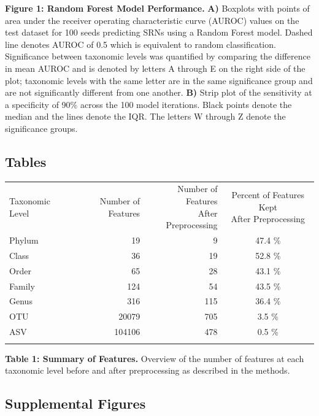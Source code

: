 \documentclass[
]{article}
\begin{document}
\textbf{Figure 1: Random Forest Model Performance.} \textbf{A)} Boxplots
with points of area under the receiver operating characteristic curve
(AUROC) values on the test dataset for 100 seeds predicting SRNs using a
Random Forest model. Dashed line denotes AUROC of 0.5 which is
equivalent to random classification. Significance between taxonomic
levels was quantified by comparing the difference in mean AUROC and is
denoted by letters A through E on the right side of the plot; taxonomic
levels with the same letter are in the same significance group and are
not significantly different from one another. \textbf{B)} Strip plot of
the sensitivity at a specificity of 90\% across the 100 model
iterations. Black points denote the median and the lines denote the IQR.
The letters W through Z denote the significance groups.

\newpage

\hypertarget{tables}{%
\subsection{Tables}\label{tables}}

\begin{longtable}[]{@{}lrrc@{}}
\toprule
Taxonomic Level & Number of Features &
\makecell[c]{Number of Features \\ After Preprocessing} &
\makecell[c]{Percent of Features Kept \\ After Preprocessing} \\ \addlinespace
\midrule
\endhead
Phylum & 19 & 9 & 47.4 \% \\ \addlinespace
Class & 36 & 19 & 52.8 \% \\ \addlinespace
Order & 65 & 28 & 43.1 \% \\ \addlinespace
Family & 124 & 54 & 43.5 \% \\ \addlinespace
Genus & 316 & 115 & 36.4 \% \\ \addlinespace
OTU & 20079 & 705 & 3.5 \% \\ \addlinespace
ASV & 104106 & 478 & 0.5 \% \\ \addlinespace
\bottomrule
\end{longtable}

\textbf{Table 1: Summary of Features.} Overview of the number of
features at each taxonomic level before and after preprocessing as
described in the methods.

\newpage

\hypertarget{supplemental-figures}{%
\subsection{Supplemental Figures}\label{supplemental-figures}}
\end{document}
